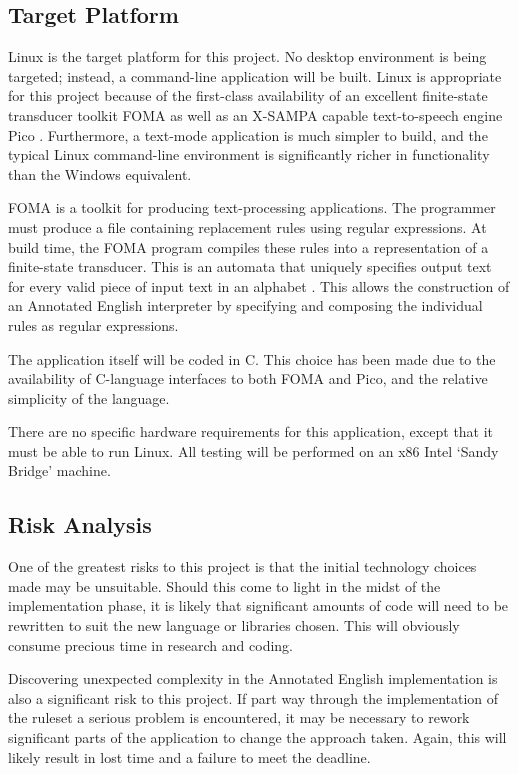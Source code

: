 \documentclass[fleqn]{llncs}
\begin{document}
\subsection{Target Platform}
Linux is the target platform for this project. No desktop environment is being targeted; instead, a command-line application will be built. Linux is appropriate for this project because of the first-class availability of an excellent finite-state transducer toolkit FOMA \cite{foma} as well as an X-SAMPA capable text-to-speech engine Pico \cite{pico}. Furthermore, a text-mode application is much simpler to build, and the typical Linux command-line environment is significantly richer in functionality than the Windows equivalent. 

FOMA is a toolkit for producing text-processing applications. The programmer must produce a file containing replacement rules using regular expressions. At build time, the FOMA program compiles these rules into a representation of a finite-state transducer. This is an automata that uniquely specifies output text for every valid piece of input text in an alphabet \cite{fst}. This allows the construction of an Annotated English interpreter by specifying and composing the individual rules as regular expressions.

The application itself will be coded in C. This choice has been made due to the availability of C-language interfaces to both FOMA and Pico, and the relative simplicity of the language.

There are no specific hardware requirements for this application, except that it must be able to run Linux. All testing will be performed on an x86 Intel `Sandy Bridge' machine.

\subsection{Risk Analysis}
One of the greatest risks to this project is that the initial technology choices made may be unsuitable. Should this come to light in the midst of the implementation phase, it is likely that significant amounts of code will need to be rewritten to suit the new language or libraries chosen. This will obviously consume precious time in research and coding.

Discovering unexpected complexity in the Annotated English implementation is also a significant risk to this project. If part way through the implementation of the ruleset a serious problem is encountered, it may be necessary to rework significant parts of the application to change the approach taken. Again, this will likely result in lost time and a failure to meet the deadline.
\end{document}
